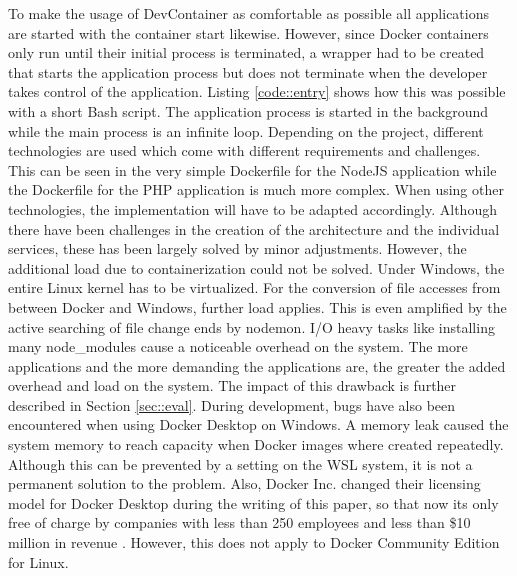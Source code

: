         To make the usage of DevContainer as comfortable as possible all applications are started with the container start likewise. However, since Docker containers only run until their initial process is terminated, a wrapper had to be created that starts the application process but does not terminate when the developer takes control of the application. Listing \ref{code::entry} shows how this was possible with a short Bash script. The application process is started in the background while the main process is an infinite loop. \newline
        Depending on the project, different technologies are used which come with different requirements and challenges. This can be seen in the very simple Dockerfile for the NodeJS application while the Dockerfile for the PHP application is much more complex. When using other technologies, the implementation will have to be adapted accordingly.\newline
        Although there have been challenges in the creation of the architecture and the individual services, these has been largely solved by minor adjustments. However, the additional load due to containerization could not be solved. Under Windows, the entire Linux kernel has to be virtualized. For the conversion of file accesses from between Docker and Windows, further load applies. This is even amplified by the active searching of file change ends by nodemon. \acs{I/O} heavy tasks like installing many node\_modules cause a noticeable overhead on the system. The more applications and the more demanding the applications are, the greater the added overhead and load on the system. The impact of this drawback is further described in Section \ref{sec::eval}. \newline
        During development, bugs have also been encountered when using Docker Desktop on Windows. A memory leak caused the system memory to reach capacity when Docker images where created repeatedly. Although this can be prevented by a setting on the \ac{WSL} system, it is not a permanent solution to the problem. Also, Docker Inc. changed their licensing model for Docker Desktop during the writing of this paper, so that now its only free of charge by companies with less than 250 employees and less than \$10 million in revenue \cite{dockerblog}. However, this does not apply to Docker Community Edition for Linux.

